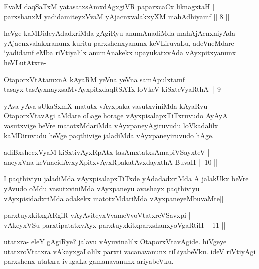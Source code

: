 \begin{shl}
EvaM daqSaTxM yatasatxsAmxdAgxgiVR paparxcaCx liknagxtaH |\\
parxshanxM yadidamiteyxVvaM yAjacnxvalakxyXM mahAdhiyamf \hfill || 8 ||
\end{shl}

\begin{artha}
heVge kaMDideyAdadxriMda gAgiRyu anumAnadiMda mahAjAcnxniyAda yAjacnxvalakxranunx kuritu parxshenxyanunx  keVLiruvaLu, adeVneMdare `yadidamf eMba riVtiyalilx anumAnakekx upayukatxvAda vAyxpitxyanunx heVLutAtxre-
\end{artha}


\begin{shl}
OtaporxVtAtamxnA kAyaRM yeVna yeVna samApulxtamf |\\
tasayx tasAyxnayxsaMvAyxpitxdaqRSATx loVkeV kiSxteVyaRthA \hfill || 9 ||
\end{shl}

\begin{artha}
yAva yAva sUkaSxmX matutx vAyxpaka vasutxviniMda kAyaRvu OtaporxVtavAgi aMdare oLage horage vAyxpisalapxTiTxruvudo AyAyA vasutxvige beVre matotxMdariMda vAyxpaneyAgiruvudu loVkadalilx kaMDiruvudu heVge paqthivige jaladiMda vAyxpaneyiruvudo hAge. 
\end{artha}

\begin{shl}
adiBxshecxVyaM kiSxtivAyxRpAtx tasAmxtatxsAmapiVSayxteV |\\
aneyxVna keVnacidAvxyXpitxvAyxRpakatAvxdayxthA BuvaH \hfill || 10 ||
\end{shl}

\begin{artha}
I paqthiviyu jaladiMda vAyxpisalapxTiTxde yAdadadxriMda A jalakUkx beVre yAvudo oMdu vasutxviniMda vAyxpaneyu avashayx paqthiviyu vAyxpisidadxriMda adakekx matotxMdariMda vAyxpaneyeMbuvaMte||
\end{artha}

\begin{shl}
parxtuyxkitxgARgiR vAyAviteyxVvameVvoVtatxreVSavxpi |\\
vAkeyxVSu parxtipatatxvAyx parxtuyxkitxparxshanxyoVgaRtiH \hfill || 11 ||
\end{shl}

\begin{artha}
utatxra- eleY gAgiRye? jalavu vAyuvinalilx OtaporxVtavAgide. hiVgeye utatxroVtatxra vAkayxgaLalilx parxti vacanavanunx tiLiyabeVku. ideV riVtiyAgi parxshenx utatxra ivugaLa gamanavanunx ariyabeVku.
\end{artha}

